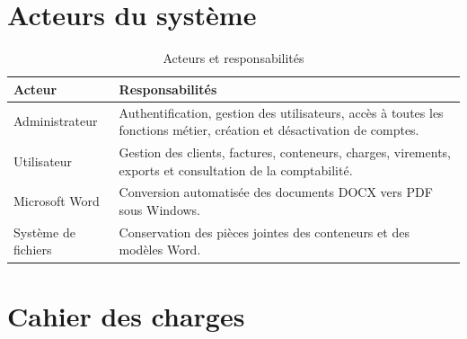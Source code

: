 \documentclass[12pt,a4paper,oneside]{report}
\begin{document}
\section{Acteurs du système}
\begin{table}[H]\centering
\caption{Acteurs et responsabilités}
\begin{tabularx}{\textwidth}{p{3cm}Y}
\toprule
\textbf{Acteur} & \textbf{Responsabilités}\\
\midrule
Administrateur & Authentification, gestion des utilisateurs, accès à toutes les fonctions métier, création et désactivation de comptes.\\
Utilisateur & Gestion des clients, factures, conteneurs, charges, virements, exports et consultation de la comptabilité.\\
Microsoft Word & Conversion automatisée des documents DOCX vers PDF sous Windows.\\
Système de fichiers & Conservation des pièces jointes des conteneurs et des modèles Word.\\
\bottomrule
\end{tabularx}
\end{table}

\section{Cahier des charges}
\end{document}
